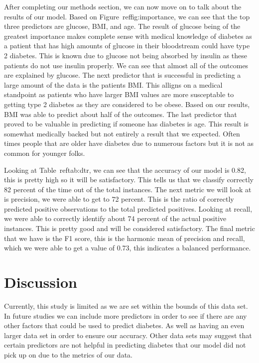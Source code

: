 \documentclass[12pt]{article}
\begin{document}
After completing our methods section, we can now move on to talk about the results of our model. Based on Figure~ref{fig:importance}, we can 
see that the top three predictors are glucose, BMI, and age. The result of glucose being of the greatest importance makes complete sense with 
medical knowledge of diabetes as a patient that has high amounts of glucose in their bloodstream could have type 2 diabetes. This is known due
to glucose not being absorbed by insulin as these patients do not use insulin properly. We can see that almost all of the outcomes are explained
by glucose. The next predictor that is successful in predicting a large amount of the data is the patients BMI. This alligns on a medical standpoint
as patients who have larger BMI values are more susceptable to getting type 2 diabetes as they are considered to be obese. Based on our results, BMI
was able to predict about half of the outcomes. The last predictor that proved to be valuable in predicting if someone has diabetes is age. This result
is somewhat medically backed but not entirely a result that we expected. Often times people that are older have diabetes due to numerous factors but it is 
not as common for younger folks.

Looking at Table~ref{tab:dtr}, we can see that the accuracy of our model is 0.82, this is pretty high so it will be satisfactory. This tells us that we 
classify correctly 82 percent of the time out of the total instances. The next metric we will look at is precision, we were able to get to 72 percent.
This is the ratio of correctly predicted positive observations to the total predicted positives. Looking at recall, we were able to correctly identify about
74 percent of the actual positive instances. This is pretty good and will be considered satisfactory. The final metric that we have is the F1 score, this is the
harmonic mean of precision and recall, which we were able to get a value of 0.73, this indicates a balanced performance.  

\section{Discussion}
\label{sec:disc}

Currently, this study is limited as we are set within the bounds of this data set. In future studies we can include more predictors in 
order to see if there are any other factors that could be used to predict diabetes. As well as having an even larger data set in order to 
ensure our accuracy. Other data sets may suggest that certain predictors are not helpful in predicting diabetes that our model did not pick 
up on due to the metrics of our data. 
\end{document}
